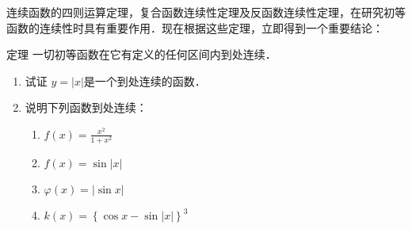 连续函数的四则运算定理，复合函数连续性定理及反函数连续性定理，在研究初等函数的连续性时具有重要作用．现在根据这些定理，立即得到一个重要结论：

\begin{blk}
 {定理} 一切初等函数在它有定义的任何区间内到处连续．
\end{blk}

\begin{ex}
\begin{enumerate}
    \item 试证 $y=|x|$是一个到处连续的函数．
    \item 说明下列函数到处连续：
\begin{multicols}{2}
\begin{enumerate}
    \item $f(x)=\frac{x^2}{1+x^2}$
    \item $f(x)=\sin|x|$
    \item $\varphi(x)=|\sin x|$
    \item $k(x)=\left\{\cos x-\sin|x|\right\}^3$
\end{enumerate}
\end{multicols}


\end{enumerate}
\end{ex}
